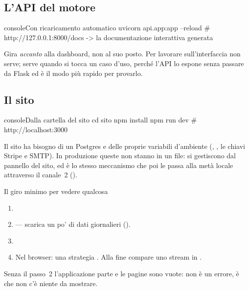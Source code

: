 \subsection{L'API del motore}

\begin{codiceInterno}{console}{Con ricaricamento automatico}{}
uvicorn api.app:app --reload
# http://127.0.0.1:8000/docs  -> la documentazione interattiva generata
\end{codiceInterno}

\noindent
Gira \emph{accanto} alla dashboard, non al suo posto. Per lavorare
sull'interfaccia non serve; serve quando si tocca un caso d'uso, perché
l'API lo espone senza passare da Flask ed è il modo più rapido per provarlo.

\subsection{Il sito}

\begin{codiceInterno}{console}{Dalla cartella del sito}{}
cd sito
npm install
npm run dev
# http://localhost:3000
\end{codiceInterno}

\noindent
Il sito ha bisogno di un Postgres e delle proprie variabili d'ambiente
(, , le chiavi Stripe e SMTP). In
produzione queste non stanno in un file: si gestiscono dal pannello del
sito, ed è lo stesso meccanismo che poi le passa alla metà locale attraverso
il canale~\num{2} ().

\begin{pratica}{Il giro minimo per vedere qualcosa}
\begin{enumerate}
  \item {}
  \item {} --- scarica un po' di dati
        giornalieri ().
  \item {}
  \item Nel browser:  \freccia{} una strategia \freccia{}
        . Alla fine compare uno stream in
        .
\end{enumerate}
Senza il passo~\num{2} l'applicazione parte e le pagine sono vuote: non è un
errore, è che non c'è niente da mostrare.
\end{pratica}
